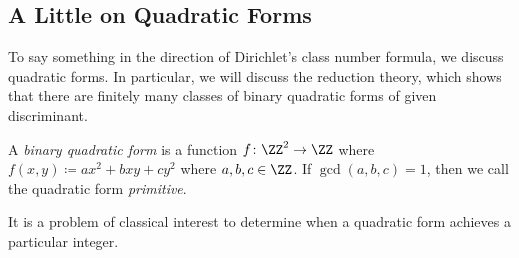 \documentclass[../notes.tex]{subfiles}
\begin{document}
\subsection{A Little on Quadratic Forms}
To say something in the direction of Dirichlet's class number formula, we discuss quadratic forms. In particular, we will discuss the reduction theory, which shows that there are finitely many classes of binary quadratic forms of given discriminant.
\begin{definition}
	A \textit{binary quadratic form} is a function $f\colon\ZZ^2\to\ZZ$ where $f(x,y)\coloneqq ax^2+bxy+cy^2$ where $a,b,c\in\ZZ$. If $\gcd(a,b,c)=1$, then we call the quadratic form \textit{primitive}.
\end{definition}
It is a problem of classical interest to determine when a quadratic form achieves a particular integer.
\end{document}
